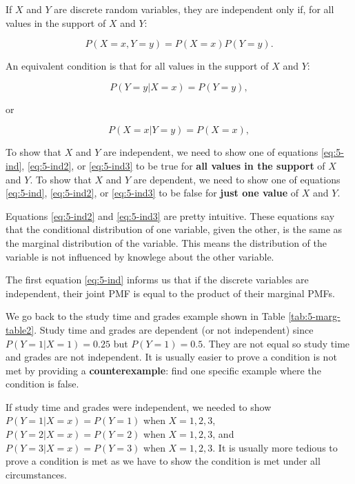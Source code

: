 \documentclass[
]{book}
\begin{document}
If \(X\) and \(Y\) are discrete random variables, they are independent only if, for all values in the support of \(X\) and \(Y\):

\begin{equation} 
P(X=x, Y=y) = P(X=x) P(Y=y).
\label{eq:5-ind}
\end{equation}

An equivalent condition is that for all values in the support of \(X\) and \(Y\):

\begin{equation} 
P(Y=y | X=x) = P(Y=y),
\label{eq:5-ind2}
\end{equation}

or

\begin{equation} 
P(X=x | Y=y) = P(X=x),
\label{eq:5-ind3}
\end{equation}

To show that \(X\) and \(Y\) are independent, we need to show one of equations \eqref{eq:5-ind}, \eqref{eq:5-ind2}, or \eqref{eq:5-ind3} to be true for \textbf{all values in the support} of \(X\) and \(Y\). To show that \(X\) and \(Y\) are dependent, we need to show one of equations \eqref{eq:5-ind}, \eqref{eq:5-ind2}, or \eqref{eq:5-ind3} to be false for \textbf{just one value} of \(X\) and \(Y\).

Equations \eqref{eq:5-ind2} and \eqref{eq:5-ind3} are pretty intuitive. These equations say that the conditional distribution of one variable, given the other, is the same as the marginal distribution of the variable. This means the distribution of the variable is not influenced by knowlege about the other variable.

The first equation \eqref{eq:5-ind} informs us that if the discrete variables are independent, their joint PMF is equal to the product of their marginal PMFs.

We go back to the study time and grades example shown in Table \ref{tab:5-marg-table2}. Study time and grades are dependent (or not independent) since \(P(Y=1|X=1) = 0.25\) but \(P(Y=1) = 0.5\). They are not equal so study time and grades are not independent. It is usually easier to prove a condition is not met by providing a \textbf{counterexample}: find one specific example where the condition is false.

If study time and grades were independent, we needed to show \(P(Y=1|X=x) = P(Y=1)\) when \(X=1,2,3\), \(P(Y=2|X=x) = P(Y=2)\) when \(X=1,2,3\), and \(P(Y=3|X=x) = P(Y=3)\) when \(X=1,2,3\). It is usually more tedious to prove a condition is met as we have to show the condition is met under all circumstances.
\end{document}
